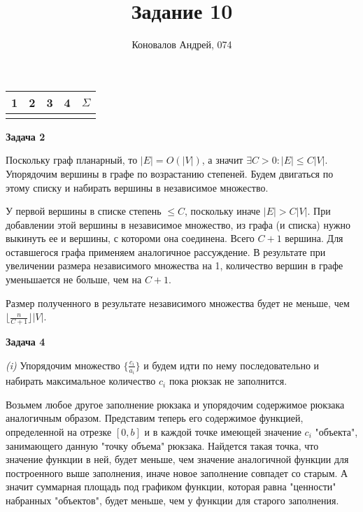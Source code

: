 \documentclass[10pt]{article}
\title{Задание 10}
\author{Коновалов Андрей, 074}
\date{}
\begin{document}
\maketitle

\noindent
\begin{tabularx}{\textwidth}{|C|C|C|C|C|}
   & 2 & 3 & 4 & $\Sigma$ \\
  \hline
  &&&& \\
  \hline
\end{tabularx}

\bigskip

{\bf Задача 2}

Поскольку граф планарный, то $|E| = O(|V|)$, а значит $\exists C > 0: |E| \leq C |V|$.
Упорядочим вершины в графе по возрастанию степеней.
Будем двигаться по этому списку и набирать вершины в независимое множество.

У первой вершины в списке степень $\leq C$, поскольку иначе $|E| > C |V|$.
При добавлении этой вершины в независимое множество, из графа (и списка) нужно выкинуть ее и вершины, с котороми она соединена.
Всего $C + 1$ вершина.
Для оставшегося графа применяем аналогичное рассуждение.
В результате при увеличении размера независимого множества на 1, количество вершин в графе уменьшается не больше, чем на $C + 1$.

Размер полученного в результате независимого множества будет не меньше, чем $\lfloor \frac{n}{C + 1} \rfloor |V|$.

\medskip

{\bf Задача 4}

{\it (i)}
Упорядочим множество $\{ \frac{c_i}{a_i} \}$ и будем идти по нему последовательно и набирать максимальное количество $c_i$ пока рюкзак не заполнится.

Возьмем любое другое заполнение рюкзака и упорядочим содержимое рюкзака аналогичным образом.
Представим теперь его содержимое функцией, определенной на отрезке $[0, b]$ и в каждой точке имеющей значение $c_i$ "объекта", занимающего данную "точку объема" рюкзака.
Найдется такая точка, что значение функции в ней, будет меньше, чем значение аналогичной функции для построенного выше заполнения, иначе новое заполнение совпадет со старым.
А значит суммарная площадь под графиком функции, которая равна "ценности" набранных "объектов", будет меньше, чем у функции для старого заполнения.
\end{document}
